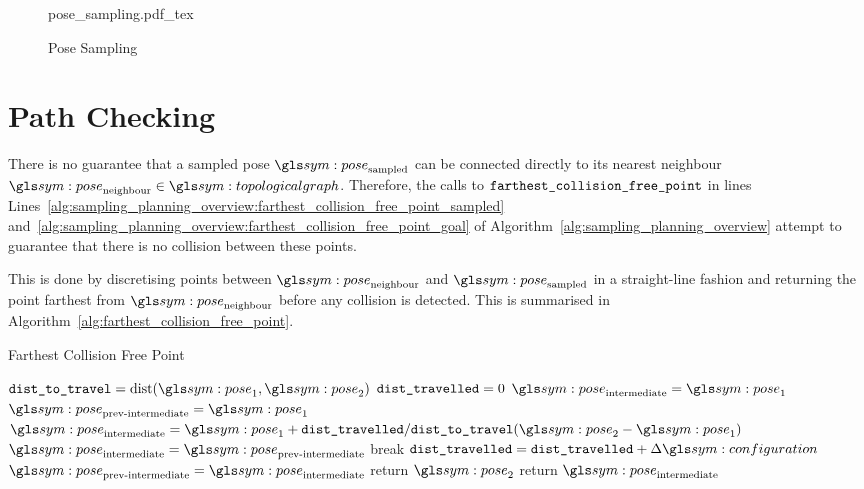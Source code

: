 			\begin{figure}[hb]
				\centering
				\def\svgwidth{\columnwidth}
				{pose_sampling.pdf_tex}
				\caption{Pose Sampling}%
				\label{fig:pose_sampling}
			\end{figure}


	\section{Path Checking}%
	\label{sec:path_checking}

		\begin{sloppypar}

			There is no guarantee that a sampled pose $\pose_\text{sampled}$ can
			be connected directly to its nearest neighbour
			$\pose_\text{neighbour} \in \topologicalgraph$.  Therefore, the calls to
			$\texttt{farthest\_collision\_free\_point}$ in lines
			Lines~\ref{alg:sampling_planning_overview:farthest_collision_free_point_sampled}
			and~\ref{alg:sampling_planning_overview:farthest_collision_free_point_goal}
			of Algorithm~\ref{alg:sampling_planning_overview} attempt to
			guarantee that there is no collision between these points.

		\end{sloppypar}

		This is done by discretising points between $\pose_\text{neighbour}$ and
		$\pose_\text{sampled}$ in a straight-line fashion and returning the
		point farthest from $\pose_\text{neighbour}$ before any collision is
		detected. This is summarised in
		Algorithm~\ref{alg:farthest_collision_free_point}.

		\begin{algorithm}[ht]
			\caption{Farthest Collision Free Point}%
			\label{alg:farthest_collision_free_point}
			\begin{algorithmic}[1]
					\State{}$\code{dist\_to\_travel} = \dist(\pose_1, \pose_2)$
					\State{}$\texttt{dist\_travelled} = 0$
					\State{}$\pose_\text{intermediate} = \pose_1$
					\State{}$\pose_\text{prev-intermediate} = \pose_1$
						\State{}
							\(
								\pose_\text{intermediate} =
								\pose_1 +
								\code{dist\_travelled}/\code{dist\_to\_travel}
								(
									\pose_2 - \pose_1
								)
							\)
							\State{}$\pose_\text{intermediate} =
								\pose_\text{prev-intermediate}$
							\State{}break
						\EndIf{}
						\State{}$\code{dist\_travelled} =
							\code{dist\_travelled} + \Delta\configuration$
						\State{}$\pose_\text{prev-intermediate} =
							\pose_\text{intermediate}$
					\EndWhile{}
						\State{}return $\pose_2$
					\EndIf{}
					\State{}return $\pose_\text{intermediate}$
				\EndProcedure{}
			\end{algorithmic}
		\end{algorithm}

